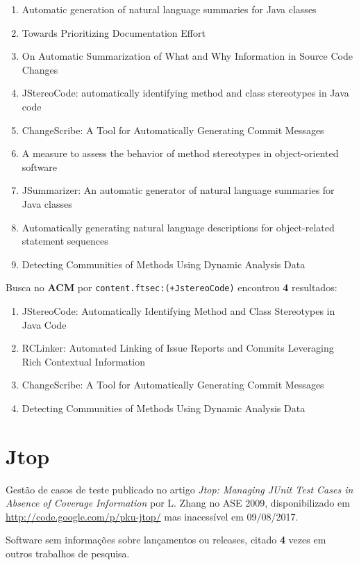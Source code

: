 \begin{enumerate}
\item Automatic generation of natural language summaries for Java classes
\item Towards Prioritizing Documentation Effort
\item On Automatic Summarization of What and Why Information in Source Code Changes
\item JStereoCode: automatically identifying method and class stereotypes in Java code
\item ChangeScribe: A Tool for Automatically Generating Commit Messages
\item A measure to assess the behavior of method stereotypes in object-oriented software
\item JSummarizer: An automatic generator of natural language summaries for Java classes
\item Automatically generating natural language descriptions for object-related statement sequences
\item Detecting Communities of Methods Using Dynamic Analysis Data
\end{enumerate}

Busca no {\bf ACM} por
\texttt{content.ftsec:(+JstereoCode)}
encontrou {\bf 4}
resultados:

\begin{enumerate}
\item JStereoCode: Automatically Identifying Method and Class Stereotypes in Java Code
\item RCLinker: Automated Linking of Issue Reports and Commits Leveraging Rich Contextual Information
\item ChangeScribe: A Tool for Automatically Generating Commit Messages
\item Detecting Communities of Methods Using Dynamic Analysis Data
\end{enumerate}

\section{Jtop}

Gestão de casos de teste
publicado no artigo {\it Jtop: Managing JUnit Test Cases in Absence of Coverage Information}
por L. Zhang
no ASE 2009,
disponibilizado em \url{http://code.google.com/p/pku-jtop/}
mas inacessível em 09/08/2017.

Software sem informações sobre lançamentos ou releases,
citado {\bf 4} vezes em outros trabalhos de pesquisa.

